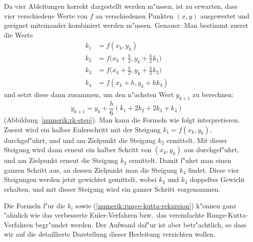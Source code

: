 Da vier Ableitungen korrekt dargestellt werden m"ussen, ist zu erwarten,
dass vier verschiedene Werte von $f$ an verschiedenen Punkten $(x,y)$
ausgewertet und geeignet miteinander kombiniert werden m"ussen.
Genauer: Man bestimmt zuerst die Werte
\begin{align*}
k_1&=f(x_k,y_k)\\
k_2&=f\biggl(x_k+\frac{h}2,y_k+\frac{h}2k_1\biggr)\\
k_3&=f\biggl(x_k+\frac{h}2,y_k+\frac{h}2k_2\biggr)\\
k_4&=f(x_k+h, y_k+hk_3)
\end{align*}
und setzt diese dann zusammen, um den n"achsten Wert $y_{k+1}$
zu berechnen:
\begin{equation}
y_{k+1} = y_k + \frac{h}6(k_1 + 2k_2 + 2k_3 + k_4)
\label{numerik:runge-kutta-rekursion}
\end{equation}
(Abbildung~\ref{numerik:rk-step}).
Man kann die Formeln wie folgt interpretieren.
Zuerst wird ein halber Eulerschritt mit der Steigung $k_1=f(x_k,y_k)$,
durchgef"uhrt, und und am Zielpunkt die Steigung $k_2$ ermittelt.
Mit dieser Steigung wird dann erneut ein halber Schritt von $(x_k,y_k)$
aus durchgef"uhrt, und am Zielpunkt erneut die Steigung $k_3$ ermittelt.
Damit f"uhrt man einen ganzen Schritt aus, an dessen Zielpunkt man die
Steigung $k_4$ findet.
Diese vier Steigungen werden jetzt gewichtet gemittelt, wobei
$k_2$ und $k_3$ doppeltes Gewicht erhalten, und mit dieser
Steigung wird ein ganzer Schritt vorgenommen.

Die Formeln f"ur die $k_i$ sowie (\ref{numerik:runge-kutta-rekursion})
k"onnen ganz "ahnlich wie das verbesserte Euler-Verfahren bzw.~das
vereinfachte Runge-Kutta-Verfahren begr"undet werden.
Der Aufwand daf"ur ist aber betr"achtlich, so dass wir auf die
detaillierte Darstellung dieser Herleitung verzichten wollen.

